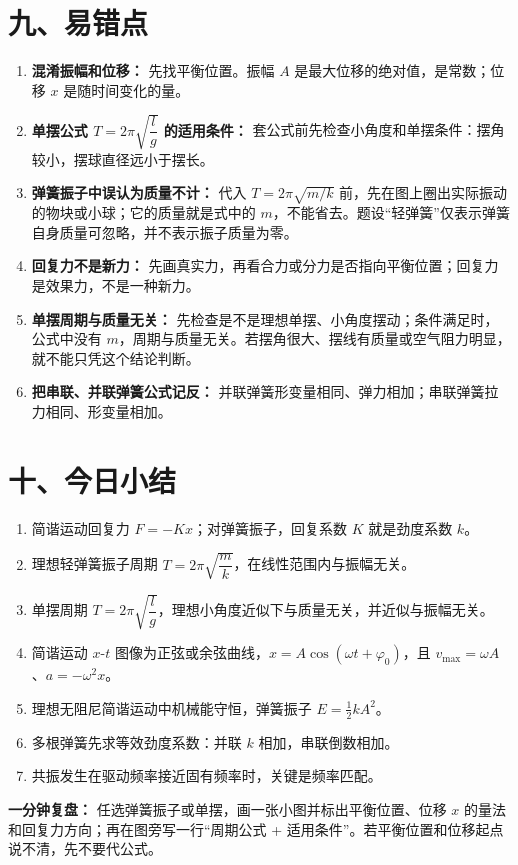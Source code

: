 \section*{九、易错点}

\begin{mistakebox}
\begin{enumerate}
  \item \textbf{混淆振幅和位移：} 先找平衡位置。振幅 $A$ 是最大位移的绝对值，是常数；位移 $x$ 是随时间变化的量。

  \item \textbf{单摆公式 $T = 2\pi\sqrt{\dfrac{l}{g}}$ 的适用条件：} 套公式前先检查小角度和单摆条件：摆角较小，摆球直径远小于摆长。

  \item \textbf{弹簧振子中误认为质量不计：} 代入 $T=2\pi\sqrt{m/k}$ 前，先在图上圈出实际振动的物块或小球；它的质量就是式中的 $m$，不能省去。题设“轻弹簧”仅表示弹簧自身质量可忽略，并不表示振子质量为零。

  \item \textbf{回复力不是新力：} 先画真实力，再看合力或分力是否指向平衡位置；回复力是效果力，不是一种新力。

  \item \textbf{单摆周期与质量无关：} 先检查是不是理想单摆、小角度摆动；条件满足时，公式中没有 $m$，周期与质量无关。若摆角很大、摆线有质量或空气阻力明显，就不能只凭这个结论判断。

  \item \textbf{把串联、并联弹簧公式记反：} 并联弹簧形变量相同、弹力相加；串联弹簧拉力相同、形变量相加。
\end{enumerate}
\end{mistakebox}

\section*{十、今日小结}

\begin{enumerate}
  \item 简谐运动回复力 $F=-Kx$；对弹簧振子，回复系数 $K$ 就是劲度系数 $k$。
  \item 理想轻弹簧振子周期 $T = 2\pi\sqrt{\dfrac{m}{k}}$，在线性范围内与振幅无关。
  \item 单摆周期 $T = 2\pi\sqrt{\dfrac{l}{g}}$，理想小角度近似下与质量无关，并近似与振幅无关。
  \item 简谐运动 $x$-$t$ 图像为正弦或余弦曲线，$x=A\cos(\omega t+\varphi_0)$，且 $v_{\max}=\omega A$、$a=-\omega^2x$。
  \item 理想无阻尼简谐运动中机械能守恒，弹簧振子 $E = \frac12 kA^2$。
  \item 多根弹簧先求等效劲度系数：并联 $k$ 相加，串联倒数相加。
  \item 共振发生在驱动频率接近固有频率时，关键是频率匹配。
\end{enumerate}

\textbf{一分钟复盘：} 任选弹簧振子或单摆，画一张小图并标出平衡位置、位移 $x$ 的量法和回复力方向；再在图旁写一行“周期公式 + 适用条件”。若平衡位置和位移起点说不清，先不要代公式。
